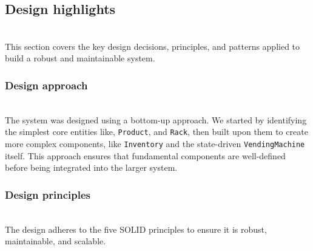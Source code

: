 \subsection{Design highlights}\label{V7ZyAtziACDAh9e5gMRyT}
\\
This section covers the key design decisions, principles, and patterns applied to build a robust and maintainable system.

\subsubsection{Design approach}\label{CfnVVzdtw-i6xVJb2_6mw}
\\
The system was designed using a bottom-up approach. We started by identifying the simplest core entities like, \texttt{Product}, and \texttt{Rack}, then built upon them to create more complex components, like \texttt{Inventory} and the state-driven \texttt{VendingMachine} itself. This approach ensures that fundamental components are well-defined before being integrated into the larger system.

\subsubsection{Design principles}\label{o1AQTLI7nKahUF6rylcsY}
\\
The design adheres to the five SOLID principles to ensure it is robust, maintainable, and scalable.

